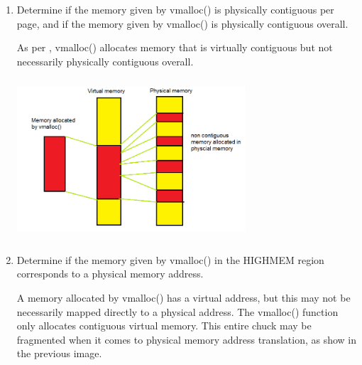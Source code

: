 \documentclass[conference]{IEEEtran}
\newcommand\tab[1][0.5cm]{\hspace*{#1}}
\begin{document}
\begin{enumerate}

\item Determine if the memory given by vmalloc() is physically contiguous per page, and if
the memory given by vmalloc() is physically contiguous overall. 

\tab As per \textcite{kmallocvsvmalloc}, vmalloc() allocates memory that is virtually contiguous but not necessarily physically contiguous overall.
\begin{center}
	\includegraphics[width=8.5cm, height=6cm]{memory7.JPG}
\end{center}

\item Determine if the memory given by vmalloc() in the HIGHMEM region corresponds to
a physical memory address.

\tab A memory allocated by vmalloc() has a virtual address, but this may not be necessarily mapped directly to a physical address. The vmalloc() function only allocates contiguous virtual memory. This entire chuck may be fragmented when it comes to physical memory address translation, as show in the previous image.
\end{enumerate}
\printbibliography
\end{document}

